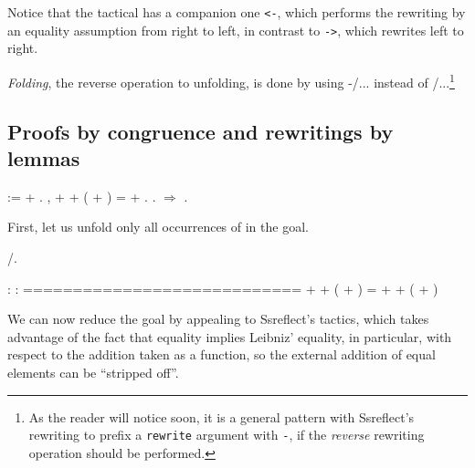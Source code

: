 Notice that the tactical has a companion one \texttt{<-}\ssrtl{<-},
which performs the rewriting by an equality assumption from right to
left, in contrast to \texttt{->}, which rewrites left to right.


\textit{Folding}, the reverse operation to unfolding, is done by using 
-/...  instead of  /...\footnote{As the reader will notice
soon, it is a general pattern with Ssreflect's rewriting to prefix a
\texttt{rewrite} argument with \texttt{-}, if the \emph{reverse}
rewriting operation should be performed.}


\subsection{Proofs by congruence and rewritings by lemmas}




\begin{coqdoccode}
\coqdocemptyline
\coqdocnoindent
{}    :=   + .\coqdoceol
\coqdocemptyline
\coqdocnoindent
{} \coqdockw{\ensuremath{\forall}}  ,  +  + ( + ) =    +   .\coqdoceol
\coqdocnoindent
{}.\coqdoceol
\coqdocnoindent
{}\ensuremath{\Rightarrow}  .\coqdoceol
\coqdocemptyline
\end{coqdoccode}


First, let us unfold only all occurrences of  in the goal.


\begin{coqdoccode}
\coqdocemptyline
\coqdocnoindent
{} /.\coqdoceol
\coqdocemptyline
\end{coqdoccode}


\coqdoceol
\coqdocemptyline
\coqdocindent{1.00em}
 : \coqdoceol
\coqdocindent{1.00em}
 : \coqdoceol
\coqdocindent{1.00em}
============================\coqdoceol
\coqdocindent{1.50em}
 +  + ( + ) =  +  + ( + )

\coqdocemptyline


We can now reduce the goal by appealing to Ssreflect's 
tactics, which takes advantage of the fact that equality implies
Leibniz' equality, in particular, with respect to the addition taken
as a function, so the external addition of equal elements can be
``stripped off''.


